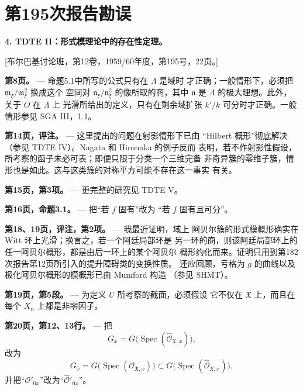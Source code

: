 \clearpage
\chapter*{第195次报告勘误}
\setcounter{footnote}{0}

\noindent\textbf{4. TDTE II：形式模理论中的存在性定理。}

\begin{center}
[布尔巴基讨论班，第12卷，1959/60年度，第195号，22页。]
\end{center}

\noindent\textbf{第8页。} --- 命题5.1中所写的公式只有在 $\Lambda$ 是域时
才正确；一般情形下，必须把 $\mathfrak m_\xi/\mathfrak m_\xi^2$ 换成这个
空间对 $\mathfrak n_\xi/\mathfrak n_\xi^2$ 的像所取的商，其中
$\mathfrak n$ 是 $\Lambda$ 的极大理想。此外，关于 $O$ 在 $\Lambda$ 上
光滑所给出的定义，只有在剩余域扩张 $k'/k$ 可分时才正确。一般情形参见
SGA III，1.1。

\noindent\textbf{第14页，评注。} --- 这里提出的问题在射影情形下已由
“Hilbert 概形”彻底解决（参见 TDTE IV）。Nagata 和 Hironaka 的例子反而
表明，若不作射影性假设，所考察的函子未必可表；即便只限于分类一个三维完备
非奇异簇的零维子簇，情形也是如此。这与这类簇的对称平方可能不存在这一事实
有关。

\noindent\textbf{第15页，第3项。} --- 更完整的研究见 TDTE V。

\noindent\textbf{第16页，命题3.1。} --- 把“若 $f$ 固有”改为
“若 $f$ 固有且可分”。

\noindent\textbf{第18、19页，评注，第2项。} --- 我最近证明，域上
阿贝尔簇的形式模概形确实在 Witt 环上光滑；换言之，若一个阿廷局部环是
另一环的商，则该阿廷局部环上的任一阿贝尔概形，都是由后一环上的某个阿贝尔
概形约化而来。证明只用到第182次报告第12页所引入的提升障碍类的变换性质。
还应回顾，亏格为 $g$ 的曲线以及极化阿贝尔概形的模概形已由 Mumford 构造
（参见 SHMT）。

\noindent\textbf{第19页，第5段。} --- 为定义 $U$ 所考察的截面，必须假设
它不仅在 $\mathfrak X$ 上，而且在每个 $X_n$ 上都是非零因子。

\noindent\textbf{第20页，第12、13行。} --- 把
\[
  G_x=G\bigl(\operatorname{Spec}(\widehat{\mathcal O}_{\mathfrak X,x})\bigr),
\]
改为
\[
  G_x=G\bigl(\operatorname{Spec}(\mathcal O_{\mathfrak X,x})\bigr)
  \subset
  G\bigl(\operatorname{Spec}(\widehat{\mathcal O}_{\mathfrak X,x})\bigr),
\]
并把“$\mathcal O'_{0x}$”改为“$\widehat{\mathcal O}'_{0x}$”。

